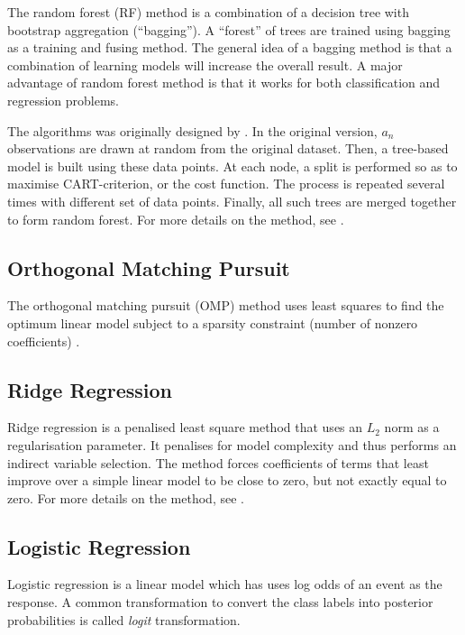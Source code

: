 \documentclass{article}
\begin{document}
The random forest (RF) method is a combination of a decision tree with bootstrap aggregation (``bagging'').  A ``forest'' of trees are trained using bagging as a training and fusing method. The general idea of a bagging method is that a combination of learning models will increase the overall result. A major advantage of random forest method is that it works for both classification and regression problems.

The algorithms was originally designed by \citet{breiman1996bagging}. In the original version, $a_n$ observations are drawn at random from the original dataset. Then, a tree-based model is built using these data points. At each node, a split is performed so as to maximise CART-criterion, or the cost function. The process is repeated several times with different set of data points. Finally, all such trees are merged together to form random forest. For more details on the method, see \citet{biau2016random}.

\subsection{Orthogonal Matching Pursuit}

The orthogonal matching pursuit (OMP) method  uses least squares to find the optimum linear model subject to a sparsity constraint (number of nonzero coefficients) \citet{sklearnlinear}. 

\subsection{Ridge Regression}

Ridge regression is a penalised least square method that uses an $L_2$ norm as a regularisation parameter. It penalises for model complexity and thus performs an indirect variable selection. The method forces coefficients of terms that least improve over a simple linear model to be close to zero, but not exactly equal to zero. For more details on the method, see \citet{eslr}.

\subsection{Logistic Regression}

Logistic regression is a linear model which has uses log odds of an event as the response. A common transformation to convert the class labels into posterior probabilities is called \textit{logit} transformation. 
\end{document}
